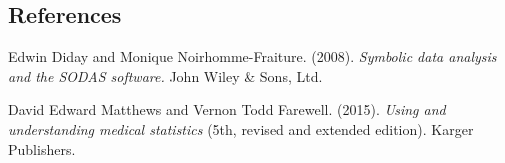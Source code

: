 \documentclass[12pt]{article}
\begin{document}
%        
%
%        

\subsection*{References}

\begin{description}

\item
Edwin Diday and Monique Noirhomme-Fraiture. (2008).
\textit{Symbolic data analysis and the SODAS software.}
John Wiley \& Sons, Ltd.

\item
David Edward Matthews and Vernon Todd Farewell. (2015).
\textit{Using and understanding medical statistics} (5th, revised and extended edition).
Karger Publishers.

\end{description}
\end{document}

